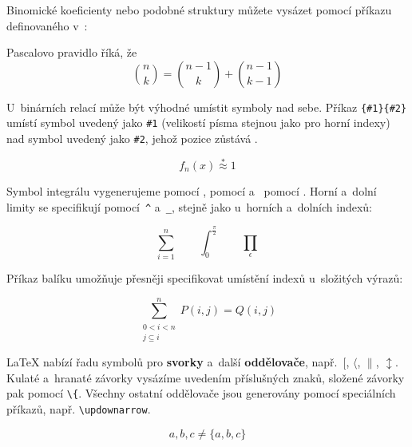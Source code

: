 Binomické koeficienty nebo podobné struktury můžete vysázet pomocí
příkazu  definovaného v~:
\begin{example}
Pascalovo pravidlo říká, že
\begin{equation*}
 \binom{n}{k} =\binom{n-1}{k}
 + \binom{n-1}{k-1}
\end{equation*}
\end{example}

U~binárních relací může být výhodné umístit symboly nad sebe.
Příkaz \verb|{#1}{#2}| umístí symbol uvedený jako
\verb|#1| (velikostí písma stejnou jako pro horní indexy) 
nad symbol uvedený jako \verb|#2|, jehož pozice zůstává .
\begin{example}
\begin{equation*}
 f_n(x) \stackrel{*}{\approx} 1
\end{equation*}
\end{example}

Symbol integrálu vygenerujeme pomocí ,
 pomocí  a~
pomocí . Horní a~dolní limity se specifikují pomocí~\verb|^|
a~\verb|_|, stejně jako u~horních a~dolních indexů:
\begin{example}
\begin{equation*}
\sum_{i=1}^n \qquad
\int_0^{\frac{\pi}{2}} \qquad
\prod_\epsilon
\end{equation*}
\end{example}

Příkaz  balíku  umožňuje přesněji specifikovat
umístění indexů u~složitých výrazů:
\begin{example}
\begin{equation*}
\sum^n_{\substack{0<i<n \\ 
        j\subseteq i}}
   P(i,j) = Q(i,j)
\end{equation*}
\end{example}



\LaTeX{} nabízí řadu symbolů pro \textbf{svorky} a~další
\textbf{oddělovače}, např.~$[$, $\langle$, $\|$, $\updownarrow$.
Kulaté a~hranaté závorky vysázíme uvedením příslušných znaků,
složené závorky pak pomocí \verb|\{|. Všechny ostatní oddělovače
jsou generovány pomocí speciálních příkazů, např. \verb|\updownarrow|.
\begin{example}
\begin{equation*}
{a,b,c} \neq \{a,b,c\}
\end{equation*}
\end{example}

